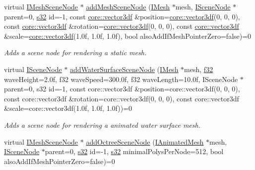 \begin{DoxyCompactItemize}
virtual \hyperlink{classirr_1_1scene_1_1IMeshSceneNode}{I\+Mesh\+Scene\+Node} $\ast$ \hyperlink{classirr_1_1scene_1_1ISceneManager_aa0a32f9f5b13d94e24eed80bdb999919}{add\+Mesh\+Scene\+Node} (\hyperlink{classirr_1_1scene_1_1IMesh}{I\+Mesh} $\ast$mesh, \hyperlink{classirr_1_1scene_1_1ISceneNode}{I\+Scene\+Node} $\ast$parent=0, \hyperlink{namespaceirr_ac66849b7a6ed16e30ebede579f9b47c6}{s32} id=-\/1, const \hyperlink{namespaceirr_1_1core_ae6e2b2a6c552833ebbd5b7463d03586b}{core\+::vector3df} \&position=\hyperlink{namespaceirr_1_1core_ae6e2b2a6c552833ebbd5b7463d03586b}{core\+::vector3df}(0, 0, 0), const \hyperlink{namespaceirr_1_1core_ae6e2b2a6c552833ebbd5b7463d03586b}{core\+::vector3df} \&rotation=\hyperlink{namespaceirr_1_1core_ae6e2b2a6c552833ebbd5b7463d03586b}{core\+::vector3df}(0, 0, 0), const \hyperlink{namespaceirr_1_1core_ae6e2b2a6c552833ebbd5b7463d03586b}{core\+::vector3df} \&scale=\hyperlink{namespaceirr_1_1core_ae6e2b2a6c552833ebbd5b7463d03586b}{core\+::vector3df}(1.\+0f, 1.\+0f, 1.\+0f), bool also\+Add\+If\+Mesh\+Pointer\+Zero=false)=0
\begin{DoxyCompactList}\small\item\em Adds a scene node for rendering a static mesh. \end{DoxyCompactList}\item 
virtual \hyperlink{classirr_1_1scene_1_1ISceneNode}{I\+Scene\+Node} $\ast$ \hyperlink{classirr_1_1scene_1_1ISceneManager_a5f5beb6271d3ab753687400dd6573044}{add\+Water\+Surface\+Scene\+Node} (\hyperlink{classirr_1_1scene_1_1IMesh}{I\+Mesh} $\ast$mesh, \hyperlink{namespaceirr_a0277be98d67dc26ff93b1a6a1d086b07}{f32} wave\+Height=2.\+0f, f32 wave\+Speed=300.\+0f, f32 wave\+Length=10.\+0f, I\+Scene\+Node $\ast$parent=0, s32 id=-\/1, const core\+::vector3df \&position=core\+::vector3df(0, 0, 0), const core\+::vector3df \&rotation=core\+::vector3df(0, 0, 0), const core\+::vector3df \&scale=core\+::vector3df(1.\+0f, 1.\+0f, 1.\+0f))=0
\begin{DoxyCompactList}\small\item\em Adds a scene node for rendering a animated water surface mesh. \end{DoxyCompactList}\item 
virtual \hyperlink{classirr_1_1scene_1_1IMeshSceneNode}{I\+Mesh\+Scene\+Node} $\ast$ \hyperlink{classirr_1_1scene_1_1ISceneManager_a503339385ca2b33d7e8035a61c4eca84}{add\+Octree\+Scene\+Node} (\hyperlink{classirr_1_1scene_1_1IAnimatedMesh}{I\+Animated\+Mesh} $\ast$mesh, \hyperlink{classirr_1_1scene_1_1ISceneNode}{I\+Scene\+Node} $\ast$parent=0, \hyperlink{namespaceirr_ac66849b7a6ed16e30ebede579f9b47c6}{s32} id=-\/1, \hyperlink{namespaceirr_ac66849b7a6ed16e30ebede579f9b47c6}{s32} minimal\+Polys\+Per\+Node=512, bool also\+Add\+If\+Mesh\+Pointer\+Zero=false)=0

\end{DoxyCompactItemize}
